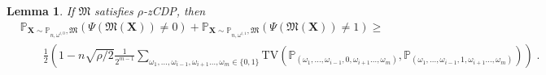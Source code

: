 \documentclass[10pt]{article} %
\newtheorem{lemma}{Lemma}
\newcommand{\Prob}[0]{\mathbb{P}}
\newcommand\mech[1]{\mathfrak{#1}}
\newcommand\vect[1]{\mathbf{#1}}
\newcommand\tv[2]{\mathrm{TV}\left( {#1}, {#2} \right)}
\newcommand\p[1]{\left( {#1}\right)}
\begin{document}
\begin{lemma}
\label{lemmalecamassouad}
    If $\mech{M}$ satisfies $\rho$-zCDP, then 
    \begin{equation*}
    \begin{aligned}
    &\Prob_{\mathbf{X} \sim \Prob_{n, \omega^{i, 0}}, \mech{M}} \p{ \Psi \p{\mech{M}(\vect{X})} \neq 0} + \Prob_{\mathbf{X} \sim \Prob_{n, \omega^{i, 1}}, \mech{M}} \p{ \Psi \p{\mech{M}(\vect{X})} \neq 1}
    \geq \\
    &\quad\quad
    \frac{1}{2} \p{1 - n\sqrt{\rho/2} \frac{1}{2^{m-1}}\sum_{\omega_1, \dots, \omega_{i-1}, \omega_{i+1} \dots, \omega_{m} \in \{0, 1 \}} \tv{\Prob_{(\omega_1, \dots, \omega_{i-1}, 0, \omega_{i+1} \dots, \omega_{m})}}{\Prob_{(\omega_1, \dots, \omega_{i-1}, 1, \omega_{i+1} \dots, \omega_{m})}}} \;.
    \end{aligned}
\end{equation*}
\end{lemma} 
\end{document}
